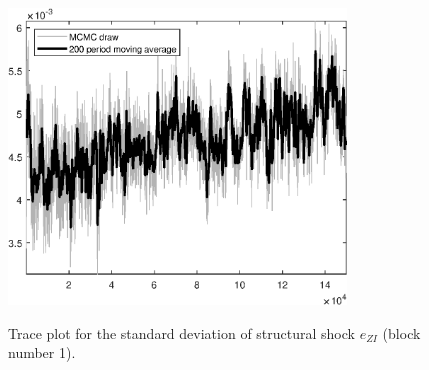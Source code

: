 \begin{figure}[H]
\centering
  \includegraphics[width=0.8\textwidth]{BRS_sectoral_KK/graphs/TracePlot_SE_e_ZI_blck_1}\\
    \caption{Trace plot for the standard deviation of structural shock ${e_{ZI}}$ (block number 1).}
\end{figure}
